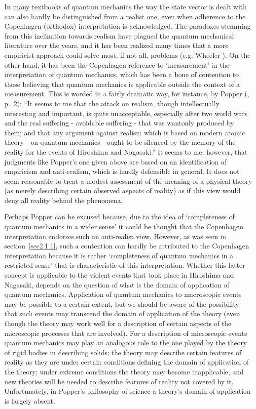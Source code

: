 \documentclass[12pt]{article}
\begin{document}
In many textbooks of quantum mechanics the way the state vector is
dealt with can also hardly be distinguished from a realist one,
even when adherence to the Copenhagen (orthodox) interpretation is
acknowledged. The paradoxes stemming from this inclination towards
realism have plagued the quantum mechanical literature over the
years, and it has been realized many times that a more empiricist
approach could solve most, if not all, problems (e.g. Wheeler
\cite{Wheeler79}). On the other hand, it has been the Copenhagen
reference to `measurement' in the interpretation of quantum
mechanics, which has been a bone of contention to those believing
that quantum mechanics is applicable outside the context of a
measurement. This is worded in a fairly dramatic way, for
instance, by Popper (\cite{Pop}, p.~2): ``It seems to me that the
attack on realism, though intellectually interesting and
important, is quite unacceptable, especially after two world wars
and the real suffering - avoidable suffering - that was wantonly
produced by them; and that any argument against realism which is
based on modern atomic theory - on quantum mechanics - ought to be
silenced by the memory of the reality for the events of Hiroshima
and Nagasaki.'' It seems to me, however, that judgments like
Popper's one given above are based on an identification of
empiricism and anti-realism, which is hardly defensible in
general. It does not seem reasonable to treat a modest assessment
of the meaning of a physical theory (as merely describing certain
observed aspects of reality) as if this view would deny all
reality behind the phenomena.

Perhaps Popper can be excused because, due to the idea of
`completeness of quantum mechanics in a wider sense' it could be
thought that the Copenhagen interpretation endorses such an
anti-realist view. However, as was seen in section~\ref{sec2.1.1},
such a contention can hardly be attributed to the Copenhagen
interpretation because it is rather `completeness of quantum
mechanics in a restricted sense' that is characteristic of this
interpretation. Whether this latter concept is applicable to the
violent events that took place in Hiroshima and Nagasaki, depends
on the question of what is the domain of application of quantum
mechanics. Application of quantum mechanics to macroscopic events
may be possible to a certain extent, but we should be aware of the
possibility that such events may transcend the domain of
application of the theory (even though the theory may work well
for a description of certain aspects of the microscopic processes
that are involved). For a description of microscopic events
quantum mechanics may play an analogous role to the one played by
the theory of rigid bodies in describing solids: the theory may
describe certain features of reality as they are under certain
conditions defining the domain of application of the theory; under
extreme conditions the theory may become inapplicable, and new
theories will be needed to describe features of reality not
covered by it. Unfortunately, in Popper's philosophy of science a
theory's domain of application is largely absent.
\end{document}
